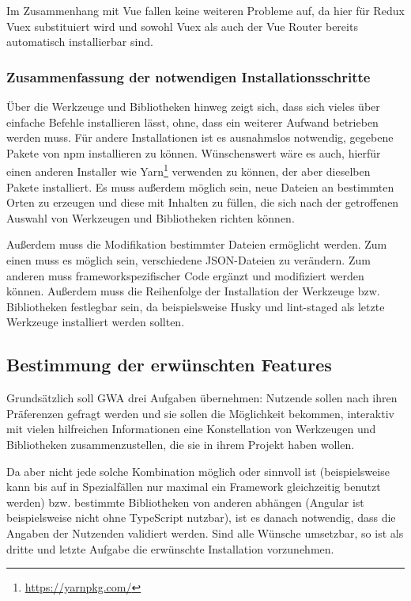 Im Zusammenhang mit Vue fallen keine weiteren Probleme auf, da hier für Redux Vuex substituiert wird und sowohl Vuex als auch der Vue Router bereits automatisch installierbar sind.

\subsubsection{Zusammenfassung der notwendigen Installationsschritte}
Über die Werkzeuge und Bibliotheken hinweg zeigt sich, dass sich vieles über einfache Befehle installieren lässt, ohne, dass ein weiterer Aufwand betrieben werden muss. Für andere Installationen ist es ausnahmslos notwendig, gegebene Pakete von \gls{npm} installieren zu können. Wünschenswert wäre es auch, hierfür einen anderen Installer wie Yarn\footnote{\url{https://yarnpkg.com/}} verwenden zu können, der aber dieselben Pakete installiert. Es muss außerdem möglich sein, neue Dateien an bestimmten Orten zu erzeugen und diese mit Inhalten zu füllen, die sich nach der getroffenen Auswahl von Werkzeugen und Bibliotheken richten können.

Außerdem muss die Modifikation bestimmter Dateien ermöglicht werden. Zum einen muss es möglich sein, verschiedene \gls{JSON}-Dateien zu verändern. Zum anderen muss frameworkspezifischer Code ergänzt und modifiziert werden können. Außerdem muss die Reihenfolge der Installation der Werkzeuge bzw. Bibliotheken festlegbar sein, da beispielsweise Husky und lint-staged als letzte Werkzeuge installiert werden sollten.

\subsection{Bestimmung der erwünschten Features}
\label{konz:all_features}
Grundsätzlich soll \gls{GWA} drei Aufgaben übernehmen: Nutzende sollen nach ihren Präferenzen gefragt werden und sie sollen die Möglichkeit bekommen, interaktiv mit vielen hilfreichen Informationen eine Konstellation von Werkzeugen und Bibliotheken zusammenzustellen, die sie in ihrem Projekt haben wollen.

Da aber nicht jede solche Kombination möglich oder sinnvoll ist (beispielsweise kann bis auf in Spezialfällen nur maximal ein Framework gleichzeitig benutzt werden) bzw. bestimmte Bibliotheken von anderen abhängen (Angular ist beispielsweise nicht ohne TypeScript nutzbar), ist es danach notwendig, dass die Angaben der Nutzenden validiert werden. Sind alle Wünsche umsetzbar, so ist als dritte und letzte Aufgabe die erwünschte Installation vorzunehmen.

